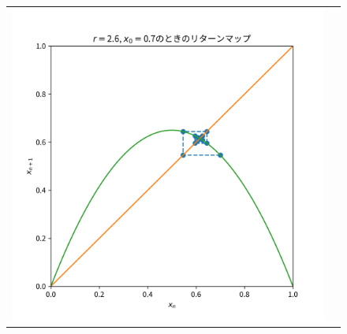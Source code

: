 \begin{figure}[htbp]
\begin{tabular}{cc}
\begin{minipage}[t]{0.45\hsize}
      \includegraphics[keepaspectratio, scale=0.3]{images/Problem1/ctest2_2_2.png}
    \end{minipage} \\


\end{tabular}
\end{figure}
